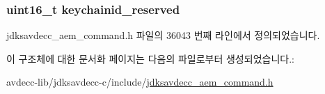 \subsubsection[{\texorpdfstring{keychainid\+\_\+reserved}{keychainid_reserved}}]{\setlength{\rightskip}{0pt plus 5cm}uint16\+\_\+t keychainid\+\_\+reserved}\hypertarget{structjdksavdecc__aem__command__auth__get__key__list_ae609f20a4491b73d052e406148b69438}{}\label{structjdksavdecc__aem__command__auth__get__key__list_ae609f20a4491b73d052e406148b69438}


jdksavdecc\+\_\+aem\+\_\+command.\+h 파일의 36043 번째 라인에서 정의되었습니다.



이 구조체에 대한 문서화 페이지는 다음의 파일로부터 생성되었습니다.\+:\begin{DoxyCompactItemize}
\item 
avdecc-\/lib/jdksavdecc-\/c/include/\hyperlink{jdksavdecc__aem__command_8h}{jdksavdecc\+\_\+aem\+\_\+command.\+h}\end{DoxyCompactItemize}
